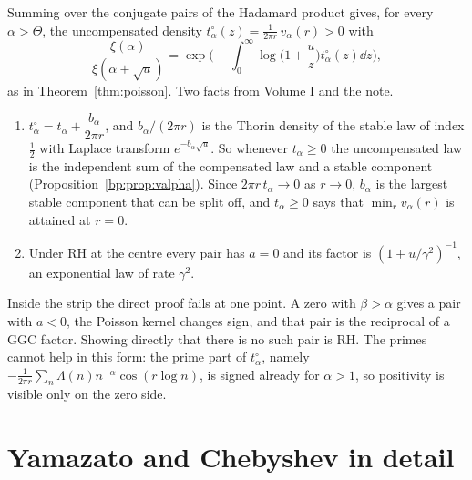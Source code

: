 Summing over the conjugate pairs of the Hadamard product gives, for every $\alpha>\Theta$, the uncompensated density $t^\circ_\alpha(z)=\frac1{2\pi r}\,v_\alpha(r)>0$ with
\[
\frac{\xi(\alpha)}{\xi(\alpha+\sqrt u)}=\exp\Big(-\int_0^\infty\log\Big(1+\frac uz\Big)t^\circ_\alpha(z)\dd z\Big),
\]
as in Theorem~\ref{thm:poisson}. Two facts from Volume I and the note.
\begin{enumerate}
\item $t^\circ_\alpha=t_\alpha+\dfrac{b_\alpha}{2\pi r}$, and $b_\alpha/(2\pi r)$ is the Thorin density of the stable law of index $\frac12$ with Laplace transform $e^{-b_\alpha\sqrt u}$. So whenever $t_\alpha\ge0$ the uncompensated law is the independent sum of the compensated law and a stable component (Proposition~\ref{bp:prop:valpha}). Since $2\pi r\,t_\alpha\to0$ as $r\to0$, $b_\alpha$ is the largest stable component that can be split off, and $t_\alpha\ge0$ says that $\min_r v_\alpha(r)$ is attained at $r=0$.
\item Under RH at the centre every pair has $a=0$ and its factor is $(1+u/\gamma^2)^{-1}$, an exponential law of rate $\gamma^2$.
\end{enumerate}
Inside the strip the direct proof fails at one point. A zero with $\beta>\alpha$ gives a pair with $a<0$, the Poisson kernel changes sign, and that pair is the reciprocal of a GGC factor. Showing directly that there is no such pair is RH. The primes cannot help in this form: the prime part of $t^\circ_\alpha$, namely $-\frac1{2\pi r}\sum_n\Lambda(n)n^{-\alpha}\cos(r\log n)$, is signed already for $\alpha>1$, so positivity is visible only on the zero side.

\section{Yamazato and Chebyshev in detail}\label{ct:sec:yamcheb}

